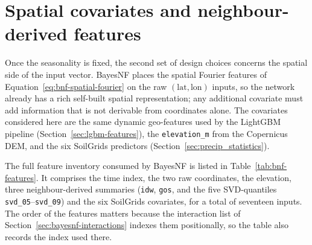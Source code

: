 \section{Spatial covariates and neighbour-derived features}
\label{sec:bayesnf-features}

Once the seasonality is fixed, the second set of design choices
concerns the spatial side of the input vector. BayesNF places the
spatial Fourier features of Equation~\eqref{eq:bnf-spatial-fourier} on
the raw $(\text{lat}, \text{lon})$ inputs, so the network already has a
rich self-built spatial representation; any additional covariate must
add information that is not derivable from coordinates alone. The
covariates considered here are the same dynamic geo-features used by
the LightGBM pipeline (Section~\ref{sec:lgbm-features}), the
\texttt{elevation\_m} from the Copernicus DEM, and the six SoilGrids
predictors (Section~\ref{sec:precip_statistics}).

The full feature inventory consumed by BayesNF is listed in
Table~\ref{tab:bnf-features}. It comprises the time index, the two raw
coordinates, the elevation, three neighbour-derived summaries
(\texttt{idw}, \texttt{gos}, and the five SVD-quantiles
\texttt{svd\_05}--\texttt{svd\_09}) and the six SoilGrids covariates,
for a total of seventeen inputs. The order of the features matters
because the interaction list of Section~\ref{sec:bayesnf-interactions}
indexes them positionally, so the table also records the index used
there.

